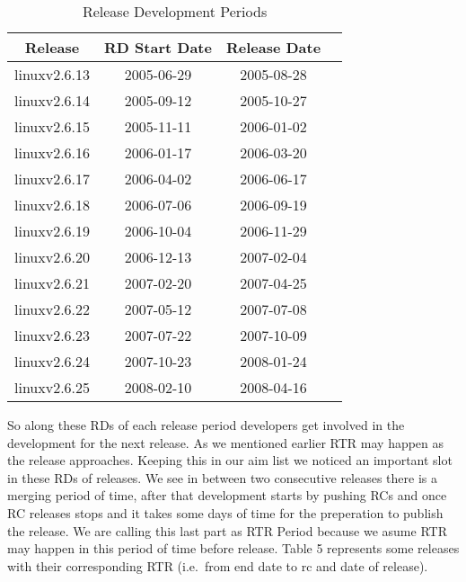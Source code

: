 \documentclass{acm_proc_article-sp}
\begin{document}
\begin{table}[ht]
\caption{Release Development Periods}  %
\centering 						%
\begin{tabular}{c c c c}				%
\hline\hline						%
Release 			& RD Start Date	& Release Date \\ [0.5ex]
\hline 							%
linuxv2.6.13		& 2005-06-29	& 2005-08-28 \\
linuxv2.6.14		& 2005-09-12	& 2005-10-27 \\
linuxv2.6.15		& 2005-11-11	& 2006-01-02 \\
linuxv2.6.16		& 2006-01-17	& 2006-03-20 \\
linuxv2.6.17		& 2006-04-02	& 2006-06-17 \\
linuxv2.6.18		& 2006-07-06	& 2006-09-19 \\
linuxv2.6.19		& 2006-10-04	& 2006-11-29 \\
linuxv2.6.20  		& 2006-12-13	& 2007-02-04 \\
linuxv2.6.21		& 2007-02-20	& 2007-04-25 \\
linuxv2.6.22		& 2007-05-12	& 2007-07-08 \\
linuxv2.6.23		& 2007-07-22	& 2007-10-09 \\
linuxv2.6.24		& 2007-10-23	& 2008-01-24 \\
linuxv2.6.25		& 2008-02-10	& 2008-04-16 \\
[1ex]							%
\hline 							%
\end{tabular}
\label{table:nonlin} 				%
\end{table}

So along these RDs of each release period developers get involved in the development for the next release. As we mentioned earlier RTR may happen as the release approaches. Keeping this in our aim list we noticed an important slot in these RDs of releases. We see in between two consecutive releases there is a merging period of time, after that development starts by pushing RCs and once RC releases stops and it takes some days of time for the preperation to publish the release. We are calling this last part as RTR Period because we asume RTR may happen in this period of time before release. Table 5 represents some releases with their corresponding RTR (i.e.\ from end date to rc and date of release).
\end{document}
